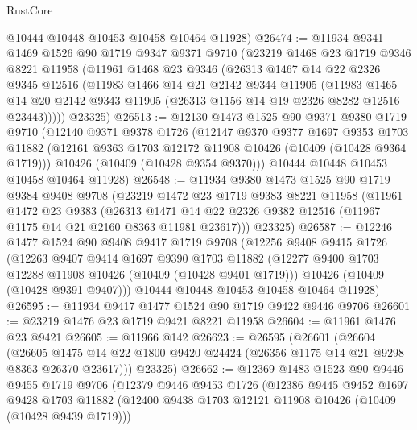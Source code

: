 \begin{lexlean}{RustCore}
\begin{coremodule}
      @10444
      @10448
      @10453
      @10458
      @10464
      @11928)
@26474 := @11934
    @9341
    @1469
    @1526
    @90
    @1719
    @9347
    @9371
    @9710
    (@23219
      @1468
      @23
      @1719
      @9346
      @8221
      @11958
      (@11961
        @1468
        @23
        @9346
        (@26313
          @1467
          @14
          @22
          @2326
          @9345
          @12516
          (@11983
            @1466
            @14
            @21
            @2142
            @9344
            @11905
            (@11983
              @1465
              @14
              @20
              @2142
              @9343
              @11905
              (@26313 @1156 @14 @19 @2326 @8282 @12516 @23443)))))
      @23325)
@26513 := @12130
    @1473
    @1525
    @90
    @9371
    @9380
    @1719
    @9710
    (@12140
      @9371
      @9378
      @1726
      (@12147
        @9370
        @9377
        @1697
        @9353
        @1703
        @11882
        (@12161 @9363 @1703 @12172 @11908 @10426 (@10409 (@10428 @9364 @1719)))
        @10426
        (@10409 (@10428 @9354 @9370)))
      @10444
      @10448
      @10453
      @10458
      @10464
      @11928)
@26548 := @11934
    @9380
    @1473
    @1525
    @90
    @1719
    @9384
    @9408
    @9708
    (@23219
      @1472
      @23
      @1719
      @9383
      @8221
      @11958
      (@11961
        @1472
        @23
        @9383
        (@26313 @1471 @14 @22 @2326 @9382 @12516 (@11967 @1175 @14 @21 @2160 @8363 @11981 @23617)))
      @23325)
@26587 := @12246
    @1477
    @1524
    @90
    @9408
    @9417
    @1719
    @9708
    (@12256
      @9408
      @9415
      @1726
      (@12263
        @9407
        @9414
        @1697
        @9390
        @1703
        @11882
        (@12277 @9400 @1703 @12288 @11908 @10426 (@10409 (@10428 @9401 @1719)))
        @10426
        (@10409 (@10428 @9391 @9407)))
      @10444
      @10448
      @10453
      @10458
      @10464
      @11928)
@26595 := @11934 @9417 @1477 @1524 @90 @1719 @9422 @9446 @9706
@26601 := @23219 @1476 @23 @1719 @9421 @8221 @11958
@26604 := @11961 @1476 @23 @9421
@26605 := @11966 @142
@26623 := @26595
    (@26601
      (@26604
        (@26605 @1475 @14 @22 @1800 @9420 @24424 (@26356 @1175 @14 @21 @9298 @8363 @26370 @23617)))
      @23325)
@26662 := @12369
    @1483
    @1523
    @90
    @9446
    @9455
    @1719
    @9706
    (@12379
      @9446
      @9453
      @1726
      (@12386
        @9445
        @9452
        @1697
        @9428
        @1703
        @11882
        (@12400 @9438 @1703 @12121 @11908 @10426 (@10409 (@10428 @9439 @1719)))

\end{coremodule}
\end{lexlean}
